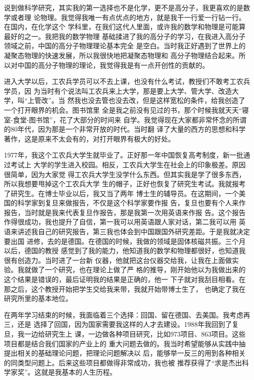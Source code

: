 \documentclass[11pt]{ctexart}
\begin{document}
{{{{说到做科学研究，其实我的第一选择也不是化学，更不是高分子，我更喜欢的是数学或者理
论物理。我觉得我唯一有点优点的地方，就是我干一行爱一行钻一行。在国内，在化学这个
学科里，在我们这代人里面，或许我的数学和物理是可能算最好的之一。我把我的数学物理
基础揉进了我的高分子的学习，在我进入高分子领域之前，中国的高分子物理理论基本完全
是空白。当时我正好遇到了世界上的凝聚态物理的快速发展，所以我很快地把凝聚态物理和
高分子物理结合起来。所以对中国的高分子物理的理论，我觉得我是有一点开创性的贡献的。

进入大学以后，工农兵学员可以不去上课，也没有什么考试，教授们不敢考工农兵学员，因
为当时有个说法叫工农兵来上大学，那是要上大学、管大学、改造大学，叫“上管改”。当
然我也没去管也没去改，但是这样宽松的条件，给我创造了一个打开眼界的机会。图书馆里
全是我之前没有见过的书，那个时候我就天天“寝室-食堂-图书馆”，花了大部分的时间来
自学。我觉得现在大家都非常怀念的所谓的80年代，因为那是一个非常开放的时代。当时翻
译了大量的西方的思想和科学著作，这是原来不太会有的，对打开眼界有极大的好处。

1977年，我这个工农兵大学生就毕业了。正好那一年中国恢复高考制度，新一批通过考试上
大学的学生进入校园。相反，工农兵大学生在社会上的印象极差。原因很简单，因为大家觉
得工农兵大学生没学什么东西。但其实我是学了很多东西，所以我想要甩掉这个工农兵大学
生的帽子，正好也恢复了研究生考试。我就报考了研究生。在博士毕业以后，我又当了两年
博士生的辅导员。在这期间，一个美国的科学家到复旦来做报告，不仅是这个科学家要作报
告，复旦也要有个人来作报告，当时就是我来代表复旦作报告，那是我第一次用英语来作报
告。这个报告作得很成功，我也提升了自信，第一我可以用英语跟人家对话，第二我可以用
英语来讲述我自己的研究报告，第三我也体会到中国跟国外研究差距。于是我就决定要出国
进修，去的是德国。在德国的时候，我做的领域是固体核磁共振。三个月以后，德国的教授
感觉到了我的能力，他知道我的数学和物理都很好，也知道我很有创造力。当时进了一台新
仪器，他就把这台仪器交给我，让我在上面做实验。我就做了一个研究，也在理论上做了严
格的推导，刚开始他以为我做出来的这个结果是错误的，最后证明我的结果是正确的，他一
下子就对我刮目相看。在那之后，这个教授开始把学生交给我来带，我就开始带博士生了，
也确定了我在研究所里的基本地位。

在两年学习结束的时候，我面临着三个选择：回国、留在德国、去美国。我考虑再三，还是
选择了回国，因为国家需要我这样的人才去建设。1988年我回到了复旦，我一边给研究生上
课，一边做各种项目研究，比如973项目、863项目。这些项目都是结合我们国家的产业上的
重大问题去做的。我当时希望能够从实践中抽提出相关的基础理论问题，把理论问题解决以
后，能够举一反三的用到各种相关的同类型问题上。后来这些项目都做得非常成功，我也被
推荐获得了“求是杰出科学家奖”。这就是我基本的人生历程。


}}}}
\end{document}
